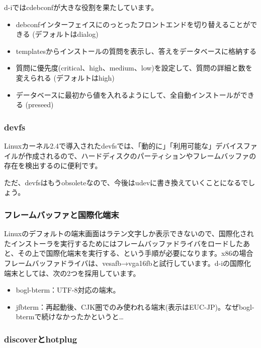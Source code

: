 \documentclass[mingoth,a4paper]{jsarticle}
\begin{document}
d-iではcdebconfが大きな役割を果たしています。

\begin{itemize}
\item debconfインターフェイスにのっとったフロントエンドを切り替えることができる (デフォルトはdialog)
\item templatesからインストールの質問を表示し、答えをデータベースに格納する
\item 質問に優先度(critical、high、medium、low)を設定して、質問の詳細と数を変えられる (デフォルトはhigh)
\item データベースに最初から値を入れるようにして、全自動インストールができる (preseed)
\end{itemize}


\subsubsection{devfs}
\label{sec:devfs}

Linuxカーネル2.4で導入されたdevfsでは、「動的に」「利用可能な」デバイスファイルが作成されるので、ハードディスクのパーティションやフレームバッファの存在を検出するのに便利です。

ただ、devfsはもうobsoleteなので、今後はudevに書き換えていくことになるでしょう。


\subsubsection{フレームバッファと国際化端末}
\label{sec:i18n}

Linuxのデフォルトの端末画面はラテン文字しか表示できないので、国際化されたインストーラを実行するためにはフレームバッファドライバをロードしたあと、その上で国際化端末を実行する、という手順が必要になります。x86の場合フレームバッファドライバは、vesafb→vga16fbと試行しています。d-iの国際化端末としては、次の2つを採用しています。

\begin{itemize}
\item bogl-bterm：UTF-8対応の端末。
\item jfbterm：再起動後、CJK圏でのみ使われる端末(表示はEUC-JP)。なぜbogl-btermで続けなかったかというと…
\end{itemize}


\subsubsection{discoverとhotplug}
\label{sec:discover}
\end{document}
